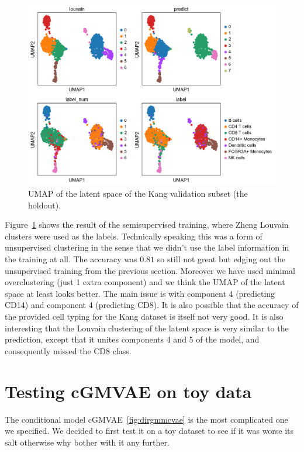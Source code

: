 \documentclass[11pt, a4paper]{report}
\theoremstyle{plain}
\theoremstyle{definition}
\theoremstyle{remark}
\begin{document}
\begin{figure}[h]
\centering
\includegraphics[width=1.1\textwidth]{images/gmmvae_kang_new_latent_louvain_pred_umap1.png}
\caption{
UMAP of the latent space of the Kang validation subset (the holdout).
}
\label{fig:kang_new_latent}
\end{figure}

Figure~\ref{fig:kang_new_latent} shows the result of the semisupervised
training, where Zheng Louvain clusters were used as the labels. Technically
speaking this was a form of unsupervised clustering in the sense that we didn't
use the label information in the training at all. The accuracy was $0.81$ so still
not great but edging out the unsupervised training from the previous section.
Moreover we have used minimal overclustering (just 1 extra component) and we
think the UMAP of the latent space at least looks better. The main issue is with
component 4 (predicting CD14) and component 4 (predicting CD8). It is also
possible that the accuracy of the provided cell typing for the Kang dataset is
itself not very good.
It is also interesting that the Louvain clustering of the latent space is very
similar to the prediction, except that it unites components 4 and 5 of the
model, and consequently missed the CD8 class.

\chapter{Testing cGMVAE on toy data}
The conditional model cGMVAE~\ref{fig:dirgmmcvae} is the most complicated one we
specified. We decided to first test it on a toy dataset to see if it was worse
its salt otherwise why bother with it any further.
\end{document}
